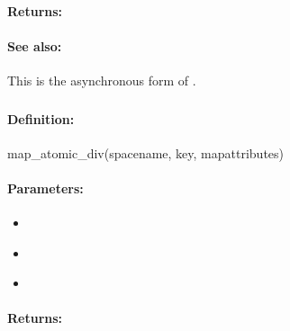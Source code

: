 \paragraph{Returns:}


\paragraph{See also:}  This is the asynchronous form of .

\pagebreak
\subsubsection{}
\label{api:ruby:map_atomic_div}


\paragraph{Definition:}
\begin{rubycode}
map_atomic_div(spacename, key, mapattributes)
\end{rubycode}

\paragraph{Parameters:}
\begin{itemize}[noitemsep]
\item {}\\

\item {}\\

\item {}\\

\end{itemize}

\paragraph{Returns:}


\pagebreak
\subsubsection{}
\label{api:ruby:async_map_atomic_div}


